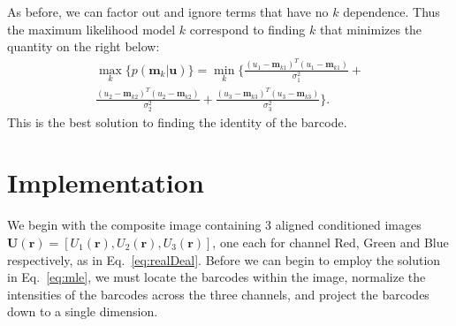 As before, we can factor out and ignore terms that have no $k$ dependence. Thus the maximum likelihood model $k$ correspond to finding $k$ that minimizes the quantity on the right below:
\begin{multline}\label{eq:mle}
\max_k   \big\{ p(\mathbf{m}_k|\mathbf{u}) \big\} =  \min_k  \Bigg\{  \frac{(u_1-\mathbf{m}_{k1})^T(u_1-\mathbf{m}_{k1})}{\sigma_1^2} +\\  
\frac{(u_2-\mathbf{m}_{k2})^T(u_2-\mathbf{m}_{k2})}{\sigma_2^2} + \frac{(u_3-\mathbf{m}_{k3})^T(u_3-\mathbf{m}_{k3})}{\sigma_3^2} \Bigg\}. 
\end{multline}
This is the best solution to finding the identity of the barcode.

\section{Implementation}
We begin with the composite image containing 3 aligned conditioned images $\mathbf{U}(\mathbf{r})=[U_1(\mathbf{r}), U_2(\mathbf{r}), U_3(\mathbf{r})]$, one each for channel Red, Green and Blue respectively, as in Eq.~\ref{eq:realDeal}. Before we can begin to employ the solution in Eq.~\ref{eq:mle}, we must locate the barcodes within the image, normalize the intensities of the barcodes across the three channels, and project the barcodes down to a single dimension. 

